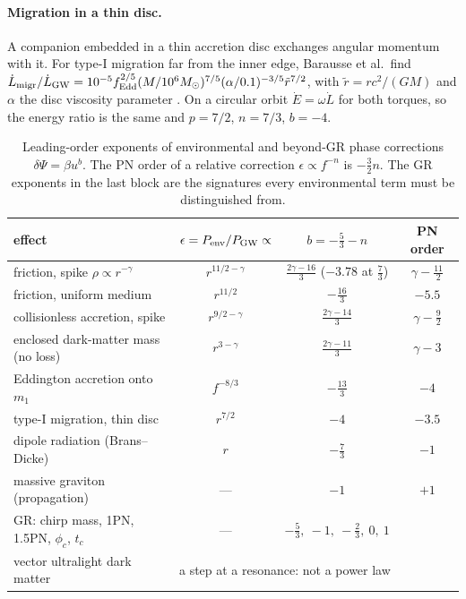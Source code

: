 \paragraph{Migration in a thin disc.} A companion embedded in a thin accretion disc exchanges angular momentum with
it. For type-I migration far from the inner edge, Barausse et al.\ find
$\dot L_{\rm migr}/\dot L_{\rm GW}=10^{-5}f_{\rm Edd}^{2/5}(M/10^6M_\odot)^{7/5}(\alpha/0.1)^{-3/5}\tilde r^{7/2}$, with
$\tilde r=rc^2/(GM)$ and $\alpha$ the disc viscosity parameter \cite[eq.~(108)]{Barausse2014}. On a circular orbit
$\dot E=\omega\dot L$ for both torques, so the energy ratio is the same and $p=7/2$, $n=7/3$, $b=-4$.

\begin{table}[htbp]
\centering
\small
\renewcommand{\arraystretch}{1.2}
\begin{tabular}{@{}lccc@{}}
\toprule
effect & $\epsilon=P_{\rm env}/P_{\rm GW}\propto$ & $b=-\frac53-n$ & PN order\\\midrule
friction, spike $\rho\propto r^{-\gamma}$ \cite{Eda2015,Coogan2022} & $r^{11/2-\gamma}$ & $\frac{2\gamma-16}3$ ($-3.78$ at $\frac73$) & $\gamma-\frac{11}2$\\
friction, uniform medium & $r^{11/2}$ & $-\frac{16}3$ & $-5.5$\\
collisionless accretion, spike \cite{Barausse2014} & $r^{9/2-\gamma}$ & $\frac{2\gamma-14}3$ & $\gamma-\frac92$\\
enclosed dark-matter mass (no loss) \cite{Eda2015,Speeney2022} & $r^{3-\gamma}$ & $\frac{2\gamma-11}3$ & $\gamma-3$\\
Eddington accretion onto $m_1$ & $f^{-8/3}$ & $-\frac{13}3$ & $-4$\\
type-I migration, thin disc \cite{Barausse2014} & $r^{7/2}$ & $-4$ & $-3.5$\\
dipole radiation (Brans--Dicke) \cite{YunesPretorius2009} & $r$ & $-\frac73$ & $-1$\\
massive graviton (propagation) \cite{YunesPretorius2009} & --- & $-1$ & $+1$\\\midrule
GR: chirp mass, 1PN, 1.5PN, $\phi_c$, $t_c$ & --- & $-\frac53,\ -1,\ -\frac23,\ 0,\ 1$ & \\
vector ultralight dark matter \cite{Chase2025} & \multicolumn{3}{l}{a step at a resonance: not a power law}\\
\bottomrule
\end{tabular}
\caption{Leading-order exponents of environmental and beyond-GR phase corrections $\delta\Psi=\beta u^b$. The PN
order of a relative correction $\epsilon\propto f^{-n}$ is $-\frac32n$. The GR exponents in the last block are the
signatures every environmental term must be distinguished from.}
\label{10b:tab:exponents}
\end{table}

